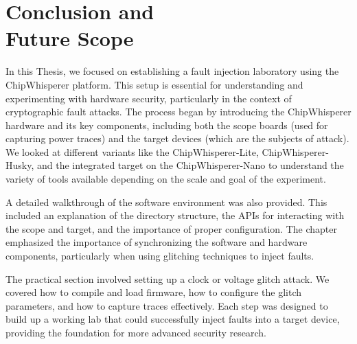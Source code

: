 \chapter[Conclusion and Future Scope]{Conclusion and \\Future Scope}



In this Thesis, we focused on establishing a fault injection laboratory using the ChipWhisperer platform. This setup is essential for understanding and experimenting with hardware security, particularly in the context of cryptographic fault attacks. The process began by introducing the ChipWhisperer hardware and its key components, including both the scope boards (used for capturing power traces) and the target devices (which are the subjects of attack). We looked at different variants like the ChipWhisperer-Lite, ChipWhisperer-Husky, and the integrated target on the ChipWhisperer-Nano to understand the variety of tools available depending on the scale and goal of the experiment.

A detailed walkthrough of the software environment was also provided. This included an explanation of the directory structure, the APIs for interacting with the scope and target, and the importance of proper configuration. The chapter emphasized the importance of synchronizing the software and hardware components, particularly when using glitching techniques to inject faults. 

The practical section involved setting up a clock or voltage glitch attack. We covered how to compile and load firmware, how to configure the glitch parameters, and how to capture traces effectively. Each step was designed to build up a working lab that could successfully inject faults into a target device, providing the foundation for more advanced security research.

